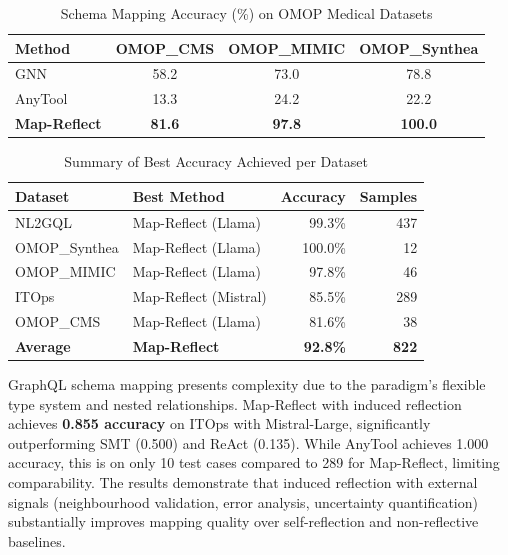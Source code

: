 \documentclass[sigconf, nonacm]{acmart}
\newcommand{\deleted}[1]{\textcolor{red}{#1}}
\begin{document}
  \begin{table}[htbp]
  \centering
  \caption{Schema Mapping Accuracy (\%) on OMOP Medical Datasets}
  \label{tab:omop_results}
  \begin{tabular}{lccc}
  \toprule
  \textbf{Method} & \textbf{OMOP\_CMS} & \textbf{OMOP\_MIMIC} & \textbf{OMOP\_Synthea} \\
  \midrule
  GNN & 58.2 & 73.0 & 78.8 \\
  AnyTool & 13.3 & 24.2 & 22.2 \\
  \textbf{Map-Reflect} & \textbf{81.6} & \textbf{97.8} & \textbf{100.0} \\
  \bottomrule
  \end{tabular}
  \end{table}


  \begin{table}[htbp]
  \centering
  \caption{Summary of Best Accuracy Achieved per Dataset}
  \begin{tabular}{llrr}
  \toprule
  \textbf{Dataset} & \textbf{Best Method} & \textbf{Accuracy} & \textbf{Samples} \\
  \midrule
  NL2GQL & Map-Reflect (Llama) & 99.3\% & 437 \\
  OMOP\_Synthea & Map-Reflect (Llama) & 100.0\% & 12 \\
  OMOP\_MIMIC & Map-Reflect (Llama) & 97.8\% & 46 \\
  ITOps & Map-Reflect (Mistral) & 85.5\% & 289 \\
  OMOP\_CMS & Map-Reflect (Llama) & 81.6\% & 38 \\
  \midrule
  \textbf{Average} & \textbf{Map-Reflect} & \textbf{92.8\%} & \textbf{822} \\
  \bottomrule
  \end{tabular}
  \end{table}
  

GraphQL schema mapping presents complexity due to the paradigm's flexible type system and nested relationships. Map-Reflect with induced reflection achieves \textbf{0.855 accuracy} on ITOps with Mistral-Large, significantly outperforming SMT (0.500) and ReAct (0.135). While AnyTool achieves 1.000 accuracy, this is on only 10 test cases compared to 289 for Map-Reflect, limiting comparability. The results demonstrate that induced reflection with external signals (neighbourhood validation, error analysis, uncertainty quantification) substantially improves mapping quality over self-reflection and non-reflective baselines.
\end{document}
